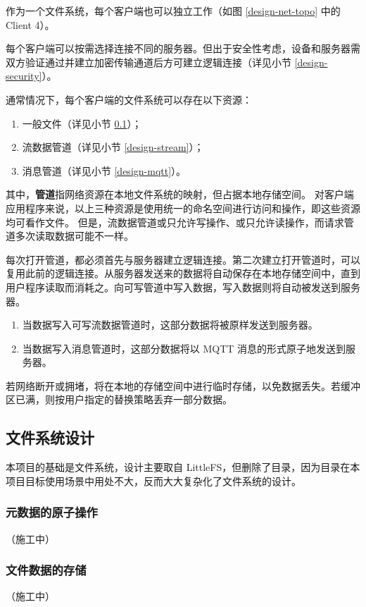 \documentclass{ctexart}
\begin{document}
作为一个文件系统，每个客户端也可以独立工作（如图 \ref{design-net-topo} 中的 Client 4）。

每个客户端可以按需选择连接不同的服务器。但出于安全性考虑，设备和服务器需双方验证通过并建立加密传输通道后方可建立逻辑连接（详见小节 \ref{design-security}）。

通常情况下，每个客户端的文件系统可以存在以下资源：
\begin{enumerate}
	\item 一般文件（详见小节 \ref{design-fs}）；
	\item 流数据管道（详见小节 \ref{design-stream}）；
	\item 消息管道（详见小节 \ref{design-mqtt}）。
\end{enumerate}
其中，\textbf{管道}指网络资源在本地文件系统的映射，但占据本地存储空间。
对客户端应用程序来说，以上三种资源是使用统一的命名空间进行访问和操作，即这些资源均可看作文件。
但是，流数据管道或只允许写操作、或只允许读操作，而请求管道多次读取数据可能不一样。

每次打开管道，都必须首先与服务器建立逻辑连接。第二次建立打开管道时，可以复用此前的逻辑连接。从服务器发送来的数据将自动保存在本地存储空间中，直到用户程序读取而消耗之。向可写管道中写入数据，写入数据则将自动被发送到服务器。
\begin{enumerate}
	\item 当数据写入可写流数据管道时，这部分数据将被原样发送到服务器。
	\item 当数据写入消息管道时，这部分数据将以 MQTT 消息的形式原子地发送到服务器。
\end{enumerate}
若网络断开或拥堵，将在本地的存储空间中进行临时存储，以免数据丢失。若缓冲区已满，则按用户指定的替换策略丢弃一部分数据。

\subsection{文件系统设计}
\label{design-fs}
本项目的基础是文件系统，设计主要取自 LittleFS，但删除了目录，因为目录在本项目目标使用场景中用处不大，反而大大复杂化了文件系统的设计。

\subsubsection{元数据的原子操作}
（施工中）

\subsubsection{文件数据的存储}
（施工中）
\end{document}
